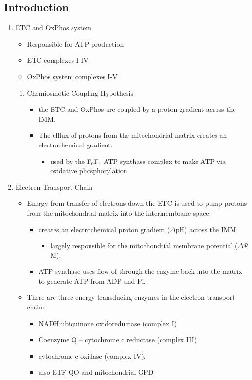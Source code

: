 \documentclass{scrartcl}
\begin{document}
\subsection{Introduction}
\label{sec:orgaa5c905}
\begin{enumerate}
\item ETC and OxPhos system
\label{sec:org70b144c}
\begin{itemize}
\item Responsible for ATP production
\item ETC complexes I-IV
\item OxPhos system complexes I-V
\end{itemize}
\begin{enumerate}
\item Chemiosmotic Coupling Hypothesis
\label{sec:org354bde3}
\begin{itemize}
\item the ETC and OxPhos are coupled by a proton gradient across the IMM.
\item The efflux of protons from the mitochondrial matrix creates an electrochemical gradient.
\begin{itemize}
\item used by the F\(_{\text{0}}\)F\(_{\text{1}}\) ATP synthase complex to make ATP via oxidative phosphorylation.
\end{itemize}
\end{itemize}
\end{enumerate}
\item Electron Transport Chain
\label{sec:org1329daf}
\begin{itemize}
\item Energy from transfer of electrons down the ETC is used to pump
protons from the mitochondrial matrix into the intermembrane space.
\begin{itemize}
\item creates an electrochemical proton gradient (\(\Delta\)pH) across the IMM.
\begin{itemize}
\item largely responsible for the mitochondrial membrane potential (\(\Delta \Psi\)M).
\end{itemize}
\item ATP synthase uses flow of  through the enzyme back into the
matrix to generate ATP from ADP and Pi.
\end{itemize}
\item There are three energy-transducing enzymes in the electron transport
chain:
\begin{itemize}
\item NADH:ubiquinone oxidoreductase (complex I)
\item Coenzyme Q – cytochrome c reductase (complex III)
\item cytochrome c oxidase (complex IV).
\item also ETF-QO and mitochondrial GPD
\end{itemize}
\end{itemize}


\end{enumerate}
\end{document}

